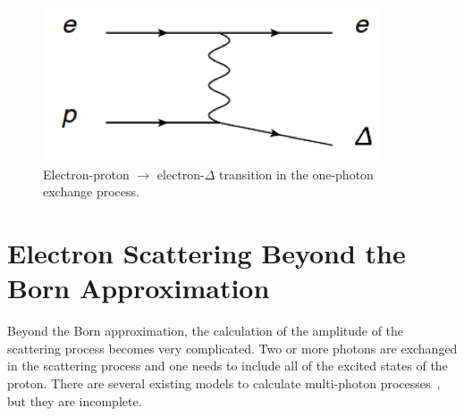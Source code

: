 \begin{figure}[!h]
	\begin{center}
	\includegraphics[width=10.0cm]{figures/epeXnoDelta}
	\end{center}
	\caption
	{Electron-proton $\rightarrow$ electron-$\Delta$ transition in the one-photon exchange process.}
	\label{fig:epeXDeltaCombined}
\end{figure}

\section{Electron Scattering Beyond the Born Approximation}
\label{Electron Scattering Beyond the Born Approximation}

Beyond the Born approximation, the calculation of the amplitude of the scattering process becomes very complicated. Two or more photons are exchanged in the scattering process and one needs to include all of the excited states of the proton. There are several existing models to calculate multi-photon processes~\cite{Niroula_BornApproximation_thesis}, but they are incomplete.

%

